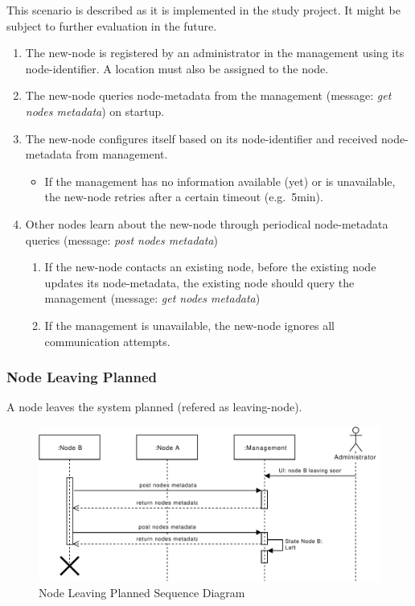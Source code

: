 This scenario is described as it is implemented in the study project. It might be subject to further evaluation in the future.

\begin{enumerate}
    \item The \gls{new-node} is registered by an \gls{administrator} in the \gls{management} using its \gls{node-identifier}. A \gls{location} must also be assigned to the \gls{node}. %
    \item The \gls{new-node} queries \gls{node-metadata} from the \gls{management} (message: \emph{get nodes metadata}) on startup.
    \item The \gls{new-node} configures itself based on its \gls{node-identifier} and received \gls{node-metadata} from \gls{management}.
        \begin{itemize}
            \item If the \gls{management} has no information available (yet) or is unavailable, the \gls{new-node} retries after a certain timeout (e.g.\ 5min).
        \end{itemize}
    \item Other \glspl{node} learn about the \gls{new-node} through periodical \gls{node-metadata} queries (message: \emph{post nodes metadata})
        \begin{enumerate}
            \item If the \gls{new-node} contacts an existing \gls{node}, before the existing \gls{node} updates its \gls{node-metadata}, the existing \gls{node} should query the \gls{management} (message: \emph{get nodes metadata})
            \item If the \gls{management} is unavailable, the \gls{new-node} ignores all communication attempts.
        \end{enumerate}
\end{enumerate}

\subsubsection{Node Leaving Planned}\label{sec:scenario-node-leave-planned}
A \gls{node} leaves the \gls{system} planned (refered as \gls{leaving-node}).

\begin{figure}[h]
    \centering
    \includegraphics[width=\linewidth]{resources/node_leaving_planned.pdf}
    \caption{Node Leaving Planned Sequence Diagram}
    \label{fig:node-leave-planned}
\end{figure}

